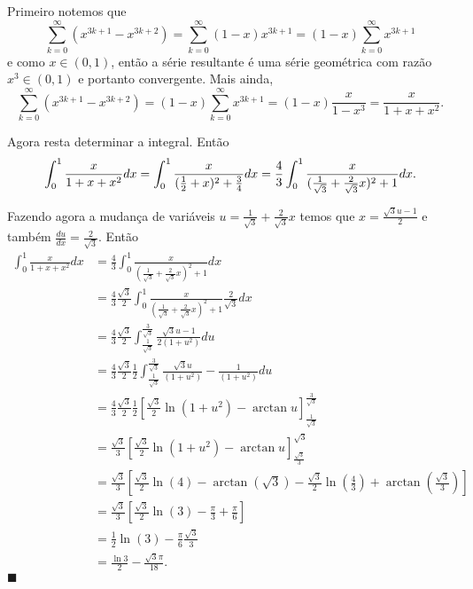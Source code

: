 \documentclass[a4paper,11pt]{report}
\renewcommand{\baselinestretch}{1.3}   %
\newenvironment{solucao}{ \vspace{.5\baselineskip} \renewcommand{\baselinestretch}{1}
                           \noindent {\bfseries Solução:} }
                        { \vspace{.5\baselineskip} \renewcommand{\baselinestretch}{1.2}
                           \hfill {\small $\blacksquare$} }
\begin{document}
\begin{solucao}
    Primeiro notemos que
    $$ \sum_{k=0}^{\infty} (x^{3k+1} - x^{3k+2})
        = \sum_{k=0}^{\infty} (1-x) x^{3k+1}
        = (1-x) \sum_{k=0}^{\infty} x^{3k+1} $$
    e como $x \in (0,1)$, então a série resultante é uma série geométrica com razão $x^{3} \in
        (0,1)$ e portanto convergente. Mais ainda,
    $$ \sum_{k=0}^{\infty} (x^{3k+1} - x^{3k+2})
        = (1-x) \sum_{k=0}^{\infty} x^{3k+1} = (1-x) \frac{x}{1-x^{3}} = \frac{x}{1+x+x^{2}}. $$

    Agora resta determinar a integral. Então
    $$ \int_{0}^{1} \frac{x}{1+x+x^{2}} dx
        = \int_{0}^{1} \frac{x}{(\frac{1}{2}+x)^{2}+\frac{3}{4}} dx \\
        = \frac{4}{3} \int_{0}^{1} \frac{x}{(\frac{1}{\sqrt{3}}+ \frac{2}{\sqrt{3}}x)^{2}+1} dx. $$

    Fazendo agora a mudança de variáveis $u = \frac{1}{\sqrt{3}} + \frac{2}{\sqrt{3}}x$ temos que
    $x = \frac{\sqrt{3}u - 1}{2}$ e também $\frac{du}{dx} = \frac{2}{\sqrt{3}}$. Então
    \begin{align*}
        \int_{0}^{1} \frac{x}{1+x+x^{2}} dx
         & = \frac{4}{3} \int_{0}^{1} \frac{x}{(\frac{1}{\sqrt{3}} + \frac{2}{\sqrt{3}}x)^{2}+1} dx                                                              \\
         & = \frac{4}{3}\frac{\sqrt{3}}{2} \int_{0}^{1} \frac{x}{(\frac{1}{\sqrt{3}} + \frac{2}{\sqrt{3}}x)^{2}+1} \frac{2}{\sqrt{3}} dx                         \\
         & = \frac{4}{3}\frac{\sqrt{3}}{2} \int_{\frac{1}{\sqrt{3}}}^{\frac{3}{\sqrt{3}}} \frac{\sqrt{3}u - 1}{2(1+u^{2})} du                                    \\
         & = \frac{4}{3}\frac{\sqrt{3}}{2} \frac{1}{2} \int_{\frac{1}{\sqrt{3}}}^{\frac{3}{\sqrt{3}}} \frac{\sqrt{3}u}{(1+u^{2})} - \frac{1}{(1+u^{2})}du        \\
         & = \frac{4}{3}\frac{\sqrt{3}}{2} \frac{1}{2} \left[ \frac{\sqrt{3}}{2} \ln(1+u^{2}) - \arctan u \right]_{\frac{1}{\sqrt{3}}}^{\frac{3}{\sqrt{3}}}      \\
         & = \frac{\sqrt{3}}{3} \left[ \frac{\sqrt{3}}{2} \ln(1+u^{2}) - \arctan u \right]_{\frac{\sqrt{3}}{3}}^{\sqrt{3}}                                       \\
         & = \frac{\sqrt{3}}{3} \left[ \frac{\sqrt{3}}{2} \ln(4) - \arctan(\sqrt{3}) - \frac{\sqrt{3}}{2} \ln(\frac{4}{3}) + \arctan(\frac{\sqrt{3}}{3}) \right] \\
         & = \frac{\sqrt{3}}{3} \left[ \frac{\sqrt{3}}{2} \ln(3) - \frac{\pi}{3} + \frac{\pi}{6} \right]                                                         \\
         & = \frac{1}{2}\ln(3) - \frac{\pi}{6} \frac{\sqrt{3}}{3}                                                                                                \\
         & = \frac{\ln 3}{2} - \frac{\sqrt{3} \pi}{18}.                                                                                                          %
    \end{align*}
\end{solucao}
\end{document}
